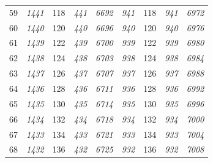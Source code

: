 \documentclass[10pt,fleqn]{article}
\begin{document}
\begin{longtable}{c|cccccccc}
59 & {\color{blue} \it 1441 \rm} & {\color{black} 118} & {\color{blue} \it 441 \rm} & {\color{blue} \it 6692 \rm} & {\color{blue} \it 941 \rm} & {\color{black} 118} & {\color{blue} \it 941 \rm} & {\color{blue} \it 6972 \rm} \\
60 & {\color{blue} \it 1440 \rm} & {\color{black} 120} & {\color{blue} \it 440 \rm} & {\color{blue} \it 6696 \rm} & {\color{blue} \it 940 \rm} & {\color{black} 120} & {\color{blue} \it 940 \rm} & {\color{blue} \it 6976 \rm} \\
61 & {\color{blue} \it 1439 \rm} & {\color{black} 122} & {\color{blue} \it 439 \rm} & {\color{blue} \it 6700 \rm} & {\color{blue} \it 939 \rm} & {\color{black} 122} & {\color{blue} \it 939 \rm} & {\color{blue} \it 6980 \rm} \\
62 & {\color{blue} \it 1438 \rm} & {\color{black} 124} & {\color{blue} \it 438 \rm} & {\color{blue} \it 6703 \rm} & {\color{blue} \it 938 \rm} & {\color{black} 124} & {\color{blue} \it 938 \rm} & {\color{blue} \it 6984 \rm} \\
63 & {\color{blue} \it 1437 \rm} & {\color{black} 126} & {\color{blue} \it 437 \rm} & {\color{blue} \it 6707 \rm} & {\color{blue} \it 937 \rm} & {\color{black} 126} & {\color{blue} \it 937 \rm} & {\color{blue} \it 6988 \rm} \\
64 & {\color{blue} \it 1436 \rm} & {\color{black} 128} & {\color{blue} \it 436 \rm} & {\color{blue} \it 6711 \rm} & {\color{blue} \it 936 \rm} & {\color{black} 128} & {\color{blue} \it 936 \rm} & {\color{blue} \it 6992 \rm} \\
65 & {\color{blue} \it 1435 \rm} & {\color{black} 130} & {\color{blue} \it 435 \rm} & {\color{blue} \it 6714 \rm} & {\color{blue} \it 935 \rm} & {\color{black} 130} & {\color{blue} \it 935 \rm} & {\color{blue} \it 6996 \rm} \\
66 & {\color{blue} \it 1434 \rm} & {\color{black} 132} & {\color{blue} \it 434 \rm} & {\color{blue} \it 6718 \rm} & {\color{blue} \it 934 \rm} & {\color{black} 132} & {\color{blue} \it 934 \rm} & {\color{blue} \it 7000 \rm} \\
67 & {\color{blue} \it 1433 \rm} & {\color{black} 134} & {\color{blue} \it 433 \rm} & {\color{blue} \it 6721 \rm} & {\color{blue} \it 933 \rm} & {\color{black} 134} & {\color{blue} \it 933 \rm} & {\color{blue} \it 7004 \rm} \\
68 & {\color{blue} \it 1432 \rm} & {\color{black} 136} & {\color{blue} \it 432 \rm} & {\color{blue} \it 6725 \rm} & {\color{blue} \it 932 \rm} & {\color{black} 136} & {\color{blue} \it 932 \rm} & {\color{blue} \it 7008 \rm} \\

\end{longtable}
\end{document}
